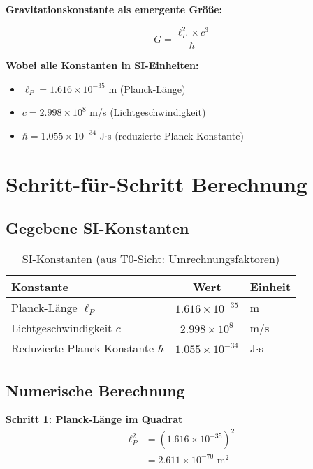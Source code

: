 \documentclass[12pt,a4paper]{article}
\theoremstyle{definition}
\begin{document}
	\begin{formula}
		\textbf{Gravitationskonstante als emergente Größe:}
		
		\begin{equation}
			\boxed{G = \frac{\ell_P^2 \times c^3}{\hbar}}
		\end{equation}
		
		\textbf{Wobei alle Konstanten in SI-Einheiten:}
		\begin{itemize}
			\item $\ell_P = 1.616 \times 10^{-35}$ m (Planck-Länge)
			\item $c = 2.998 \times 10^{8}$ m/s (Lichtgeschwindigkeit)
			\item $\hbar = 1.055 \times 10^{-34}$ J$\cdot$s (reduzierte Planck-Konstante)
		\end{itemize}
	\end{formula}
	
	\section{Schritt-für-Schritt Berechnung}
	
	\subsection{Gegebene SI-Konstanten}
	
	\begin{table}[h]
		\centering
		\begin{tabular}{lcl}
			\toprule
			\textbf{Konstante} & \textbf{Wert} & \textbf{Einheit} \\
			\midrule
			Planck-Länge $\ell_P$ & $1.616 \times 10^{-35}$ & m \\
			Lichtgeschwindigkeit $c$ & $2.998 \times 10^{8}$ & m/s \\
			Reduzierte Planck-Konstante $\hbar$ & $1.055 \times 10^{-34}$ & J$\cdot$s \\
			\bottomrule
		\end{tabular}
		\caption{SI-Konstanten (aus T0-Sicht: Umrechnungsfaktoren)}
	\end{table}
	
	\subsection{Numerische Berechnung}
	
	\textbf{Schritt 1: Planck-Länge im Quadrat}
	\begin{align}
		\ell_P^2 &= (1.616 \times 10^{-35})^2 \\
		&= 2.611 \times 10^{-70} \text{ m}^2
	\end{align}
	
\end{document}
